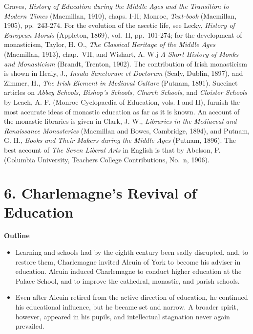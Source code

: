 \documentclass[
]{book}
\providecommand{\tightlist}{%
  \setlength{\itemsep}{0pt}\setlength{\parskip}{0pt}}
\begin{document}
Graves, \emph{History of Education during the Middle Ages and the Transition to Modern Times} (Macmillan, 1910), chaps. I-II; Monroe, \emph{Text-book} (Macmillan, 1905), pp.~243-274. For the evolution of the ascetic life, see Lecky, \emph{History of European Morals} (Appleton, 1869), vol.~II, pp.~101-274; for the development of monasticism, Taylor, H. O., \emph{The Classical Heritage of the Middle Ages} (Macmillan, 1913), chap.~VII, and Wishart, A. W.j \emph{A Short History of Monks and Monasticism} (Brandt, Trenton, 1902). The contribution of Irish monasticism is shown in Healy, J., \emph{Insula Sanctorum et Doctorum} (Sealy, Dublin, 1897), and Zimmer, H., \emph{The Irish Element in Mediaval Culture} (Putnam, 1891). Succinct articles on \emph{Abbey Schools, Bishop's Schools, Church Schools,} and \emph{Cloister Schools} by Leach, A. F. (Monroe Cyclopaedia of Education, vols. I and II), furnish the most accurate ideas of monastic education as far as it is known. An account of the monastic libraries is given in Clark, J. W., \emph{Libraries in the Mediaeval and Renaissance Monasteries} (Macmillan and Bowes, Cambridge, 1894), and Putnam, G. H., \emph{Books and Their Makers during the Middle Ages} (Putnam, 1896). The best account of \emph{The Seven Liberal Arts} in English is that by Abelson, P. (Columbia University, Teachers College Contributions, No.~n, 1906).

\hypertarget{charlemagnes-revival-of-education}{%
\chapter{6. Charlemagne's Revival of Education}\label{charlemagnes-revival-of-education}}

\textbf{Outline}

\begin{itemize}
\tightlist
\item
  Learning and schools had by the eighth century been sadly disrupted, and, to restore them, Charlemagne invited Alcuin of York to become his adviser in education. Alcuin induced Charlemagne to conduct higher education at the Palace School, and to improve the cathedral, monastic, and parish schools.
\item
  Even after Alcuin retired from the active direction of education, he continued his educational influence, but he became set and narrow. A broader spirit, however, appeared in his pupils, and intellectual stagnation never again prevailed.
\end{itemize}
\end{document}
